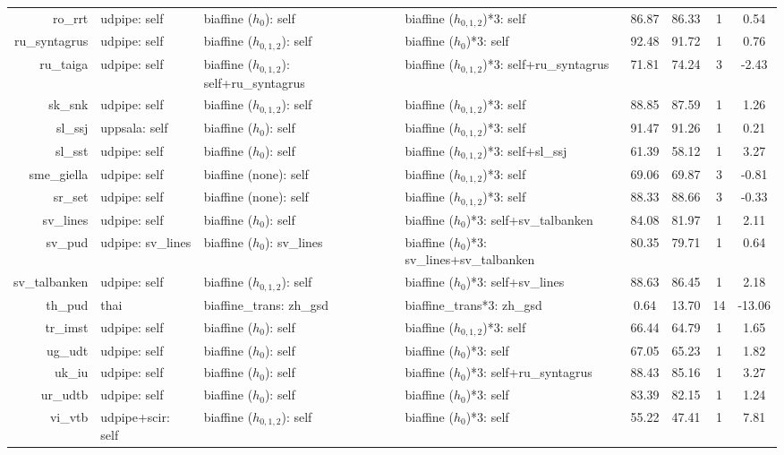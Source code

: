 \documentclass[11pt,a4paper]{article}
\begin{document}
\begin{table}[t]
\begin{tabular}{rlllcccc}
ro\_rrt & udpipe: self & biaffine ($h_{0}$): self & biaffine ($h_{0,1,2}$)*3: self & 86.87 & 86.33 & 1 & 0.54 \\
ru\_syntagrus & udpipe: self & biaffine ($h_{0,1,2}$): self & biaffine ($h_{0}$)*3: self & 92.48 & 91.72 & 1 & 0.76 \\
ru\_taiga & udpipe: self & biaffine ($h_{0,1,2}$): self+ru\_syntagrus & biaffine ($h_{0,1,2}$)*3: self+ru\_syntagrus & 71.81 & 74.24 & 3 & -2.43 \\
sk\_snk & udpipe: self & biaffine ($h_{0,1,2}$): self & biaffine ($h_{0,1,2}$)*3: self & 88.85 & 87.59 & 1 & 1.26 \\
sl\_ssj & uppsala: self & biaffine ($h_{0}$): self & biaffine ($h_{0,1,2}$)*3: self & 91.47 & 91.26 & 1 & 0.21 \\
sl\_sst & udpipe: self & biaffine ($h_{0}$): self & biaffine ($h_{0,1,2}$)*3: self+sl\_ssj & 61.39 & 58.12 & 1 & 3.27 \\
sme\_giella & udpipe: self & biaffine (none): self & biaffine ($h_{0,1,2}$)*3: self & 69.06 & 69.87 & 3 & -0.81 \\
sr\_set & udpipe: self & biaffine (none): self & biaffine ($h_{0,1,2}$)*3: self & 88.33 & 88.66 & 3 & -0.33 \\
sv\_lines & udpipe: self & biaffine ($h_{0}$): self & biaffine ($h_{0}$)*3: self+sv\_talbanken & 84.08 & 81.97 & 1 & 2.11 \\
sv\_pud & udpipe: sv\_lines & biaffine ($h_{0}$): sv\_lines & biaffine ($h_{0}$)*3: sv\_lines+sv\_talbanken & 80.35 & 79.71 & 1 & 0.64 \\
sv\_talbanken & udpipe: self & biaffine ($h_{0,1,2}$): self & biaffine ($h_{0}$)*3: self+sv\_lines & 88.63 & 86.45 & 1 & 2.18 \\
th\_pud & thai & biaffine\_trans: zh\_gsd & biaffine\_trans*3: zh\_gsd & 0.64 & 13.70 & 14 & -13.06 \\
tr\_imst & udpipe: self & biaffine ($h_{0}$): self & biaffine ($h_{0,1,2}$)*3: self & 66.44 & 64.79 & 1 & 1.65 \\
ug\_udt & udpipe: self & biaffine ($h_{0}$): self & biaffine ($h_{0}$)*3: self & 67.05 & 65.23 & 1 & 1.82 \\
uk\_iu & udpipe: self & biaffine ($h_{0}$): self & biaffine ($h_{0}$)*3: self+ru\_syntagrus & 88.43 & 85.16 & 1 & 3.27 \\
ur\_udtb & udpipe: self & biaffine ($h_{0}$): self & biaffine ($h_{0}$)*3: self & 83.39 & 82.15 & 1 & 1.24 \\
vi\_vtb & udpipe+scir: self & biaffine ($h_{0,1,2}$): self & biaffine ($h_{0}$)*3: self & 55.22 & 47.41 & 1 & 7.81 \\

\end{tabular}
\end{table}
\end{document}
